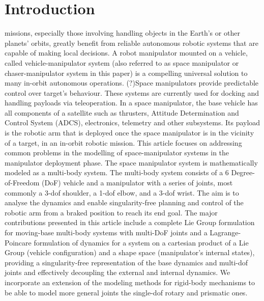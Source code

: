 \documentclass[lettersize,journal]{IEEEtran}
\begin{document}
\begin{IEEEkeywords}

\end{IEEEkeywords}


\section{Introduction}

 missions, especially those involving handling objects in the Earth's or other planets' orbits, greatly benefit from reliable autonomous robotic systems that are capable of making local decisions.
A robot manipulator mounted on a vehicle, called vehicle-manipulator system (also referred to as space manipulator or chaser-manipulator system in this paper) is a compelling universal solution to many in-orbit autonomous operations\cite{Flores-abad2007}. 
(?)Space manipulators provide predictable control over target's behaviour.
These systems are currently used for docking and handling payloads via teleoperation\cite{gibbs2002canada,king2001space, aikenhead1983canadarm}. 
In a space manipulator, the base vehicle has all components of a satellite such as thrusters, Attitude Determination and Control System (ADCS), electronics, telemetry and other subsystems. Its payload is the robotic arm that is deployed once the space manipulator is in the vicinity of a target, in an in-orbit robotic mission.
This article focuses on addressing common problems in the modelling of space-manipulator systems in the manipulator deployment phase. The space manipulator system is mathematically modeled as a multi-body system. The multi-body system consists of a 6 Degree-of-Freedom (DoF) vehicle and a manipulator with a series of joints, most commonly a 3-dof shoulder, a 1-dof elbow, and a 3-dof wrist.
The aim is to analyse the dynamics and enable singularity-free planning and control of the robotic arm from a braked position to reach its end goal. 
The major contributions presented in this article include a complete Lie Group formulation for moving-base multi-body systems with multi-DoF joints and a Lagrange-Poincare formulation of dynamics for a system on a cartesian product of a Lie Group (vehicle configuration) and a shape space (manipulator's internal states), providing a singularity-free representation of the base dynamics and multi-dof joints and effectively decoupling the external and internal dynamics\cite{park1995lie}. We incorporate an extension of the modeling methods for rigid-body mechanisms to be able to model more general joints the single-dof rotary and prismatic ones. 
\end{document}
